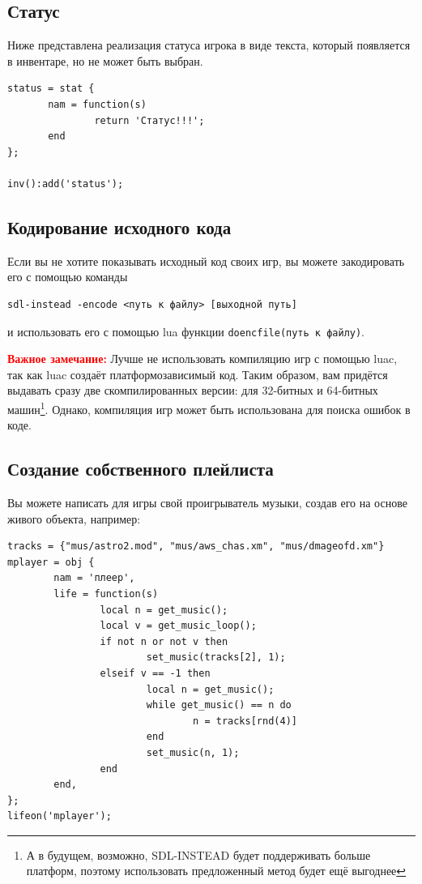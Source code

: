 \documentclass[a4paper,12pt]{article}
\begin{document}
\subsection{Статус}
Ниже представлена реализация статуса игрока в виде текста, который появляется в инвентаре, но не может быть выбран.

\begin{verbatim}
status = stat {
       nam = function(s)
               return 'Статус!!!';
       end
};

inv():add('status');
\end{verbatim}

\subsection{Кодирование исходного кода}

Если вы не хотите показывать исходный код своих игр, вы можете закодировать его с помощью команды

\begin{verbatim}
sdl-instead -encode <путь к файлу> [выходной путь]
\end{verbatim}

и использовать его с помощью lua функции \verb/doencfile(путь к файлу)/.

\textbf{\textcolor{red}{Важное замечание:}} Лучше не использовать компиляцию игр с помощью luac, так как luac создаёт платформозависимый код. Таким образом, вам придётся выдавать сразу две скомпилированных версии: для 32-битных и 64-битных машин\footnote{А в будущем, возможно, SDL-INSTEAD будет поддерживать больше платформ, поэтому использовать предложенный метод будет ещё выгоднее}. Однако, компиляция игр может быть использована для поиска ошибок в коде.

\subsection{Создание собственного плейлиста}
Вы можете написать для игры свой проигрыватель музыки, создав его на основе живого объекта, например:

\begin{verbatim}
tracks = {"mus/astro2.mod", "mus/aws_chas.xm", "mus/dmageofd.xm"}
mplayer = obj {
        nam = 'плеер',
        life = function(s)
                local n = get_music();
                local v = get_music_loop();
                if not n or not v then
                        set_music(tracks[2], 1);
                elseif v == -1 then
                        local n = get_music();
                        while get_music() == n do
                                n = tracks[rnd(4)]
                        end
                        set_music(n, 1);
                end
        end,
};
lifeon('mplayer');
\end{verbatim}
\end{document}
